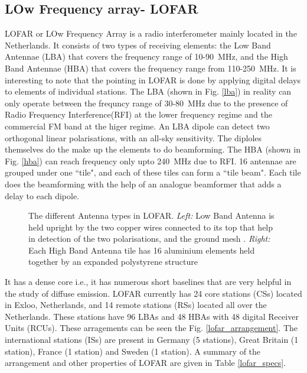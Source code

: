 \documentclass[../main/thesis_msc.tex]{subfiles}
\begin{document}
\subsection{LOw Frequency array- LOFAR}    
LOFAR or LOw Frequency Array is a radio interferometer mainly located in the Netherlands. It consists of two types of receiving elements: the Low Band Antennae (LBA) that covers the frequency range of 10-90~MHz, and the High Band Antennae (HBA) that covers the frequency range from 110-250~MHz. It is interesting to note that the pointing in LOFAR is done by applying digital delays to elements of individual stations. The LBA (shown in Fig. \ref{lba}) in reality can only operate between the frequncy range of 30-80~MHz due to the presence of Radio Frequency Interference(RFI) at the lower frequency regime and the commercial FM band at the higer regime. An LBA dipole can detect two orthogonal linear polarisations, with an all-sky sensitivity. The diploles themselves do the make up the elements to do beamforming. The HBA (shown in Fig. \ref{hba}) can reach frequency only upto 240~MHz due to RFI. 16 antennae are grouped under one ``tile", and each of these tiles can form a ``tile beam". Each tile does the beamforming with the help of an analogue beamformer that adds a delay to each dipole.

\begin{figure}[h]%
    \centering
    \qquad
    \caption{The different Antenna types in LOFAR. \textit{Left:} Low Band Antenna is held upright by the two copper wires connected to its top that help in detection of the two polarisations, and the ground mesh \citep{lba}. \textit{Right:} Each High Band Antenna tile has 16 aluminium elements held together by an expanded polystyrene structure \citep{LOFAR}}%
\end{figure}

It has a dense core i.e., it has numerous short baselines that are very helpful in the study of diffuse emission. LOFAR currently has 24 core stations (CSs) located in Exloo, Netherlands, and 14 remote stations (RSs) located all over the Netherlands. These stations have 96 LBAs and 48 HBAs with 48 digital Receiver Units (RCUs). These arragements can be seen the Fig. \ref{lofar_arrangement}. The international stations (ISs) are present in Germany (5 stations), Great Britain (1 station), France (1 station) and Sweden (1 station). A summary of the arrangement and other properties of LOFAR are given in Table \ref{lofar_specs}. 
\end{document}
